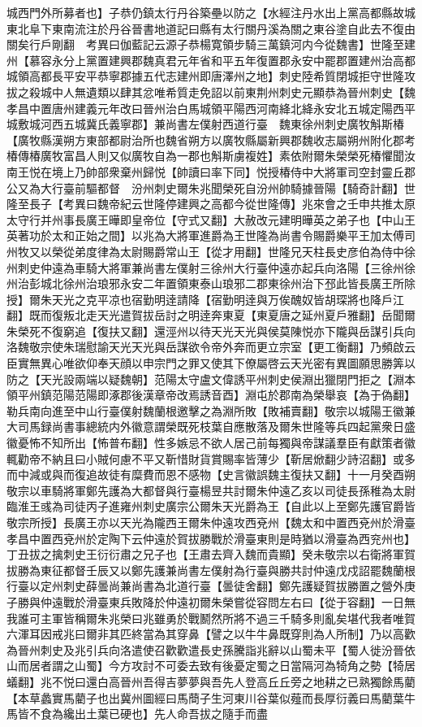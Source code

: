 城西門外所募者也】子恭仍鎮太行丹谷築壘以防之【水經注丹水出上黨高都縣故城東北阜下東南流注於丹谷晉書地道記曰縣有太行關丹溪為關之東谷塗自此去不復由關矣行戶剛翻　考異曰伽藍記云源子恭楊寛領步騎三萬鎮河内今從魏書】世隆至建州【慕容永分上黨置建興郡魏真君元年省和平五年復置郡永安中罷郡置建州治高都城領高都長平安平恭寧郡據五代志建州即唐澤州之地】刺史陸希質閉城拒守世隆攻拔之殺城中人無遺類以肆其忿唯希質走免詔以前東荆州刺史元顯恭為晉州刺史【魏孝昌中置唐州建義元年改曰晉州治白馬城領平陽西河南絳北絳永安北五城定陽西平城敷城河西五城冀氏義寧郡】兼尚書左僕射西道行臺　魏東徐州刺史廣牧斛斯椿【廣牧縣漢朔方東部都尉治所也魏省朔方以廣牧縣屬新興郡魏收志屬朔州附化郡考椿傳椿廣牧富昌人則又似廣牧自為一郡也斛斯虜複姓】素依附爾朱榮榮死椿懼聞汝南王悦在境上乃帥部衆棄州歸悦【帥讀曰率下同】悦授椿侍中大將軍司空封靈丘郡公又為大行臺前驅都督　汾州刺史爾朱兆聞榮死自汾州帥騎據晉陽【騎奇計翻】世隆至長子【考異曰魏帝紀云世隆停建興之高都今從世隆傳】兆來會之壬申共推太原太守行并州事長廣王曄即皇帝位【守式又翻】大赦改元建明曄英之弟子也【中山王英著功於太和正始之間】以兆為大將軍進爵為王世隆為尚書令賜爵樂平王加太傅司州牧又以榮從弟度律為太尉賜爵常山王【從才用翻】世隆兄天柱長史彦伯為侍中徐州刺史仲遠為車騎大將軍兼尚書左僕射三徐州大行臺仲遠亦起兵向洛陽【三徐州徐州治彭城北徐州治琅邪永安二年置領東泰山琅邪二郡東徐州治下邳此皆長廣王所除授】爾朱天光之克平凉也宿勤明逹請降【宿勤明逹與万俟醜奴皆胡琛將也降戶江翻】既而復叛北走天光遣賀拔岳討之明逹奔東夏【東夏唐之延州夏戶雅翻】岳聞爾朱榮死不復窮追【復扶又翻】還涇州以待天光天光與侯莫陳悦亦下隴與岳謀引兵向洛魏敬宗使朱瑞慰諭天光天光與岳謀欲令帝外奔而更立宗室【更工衡翻】乃頻啟云臣實無異心唯欲仰奉天顔以申宗門之罪又使其下僚屬啓云天光密有異圖願思勝筭以防之【天光設兩端以疑魏朝】范陽太守盧文偉誘平州刺史侯淵出獵閉門拒之【淵本領平州鎮范陽范陽即涿郡後漢章帝改焉誘音酉】淵屯於郡南為榮舉哀【為于偽翻】勒兵南向進至中山行臺僕射魏蘭根邀擊之為淵所敗【敗補賣翻】敬宗以城陽王徽兼大司馬録尚書事總統内外徽意謂榮既死枝葉自應散落及爾朱世隆等兵四起黨衆日盛徽憂怖不知所出【怖普布翻】性多嫉忌不欲人居己前每獨與帝謀議羣臣有獻策者徽輒勸帝不納且曰小賊何慮不平又靳惜財貨賞賜率皆薄少【靳居焮翻少詩沼翻】或多而中減或與而復追故徒有糜費而恩不感物【史言徽誤魏主復扶又翻】十一月癸酉朔敬宗以車騎將軍鄭先護為大都督與行臺楊昱共討爾朱仲遠乙亥以司徒長孫稚為太尉臨淮王彧為司徒丙子進雍州刺史廣宗公爾朱天光爵為王【自此以上至鄭先護官爵皆敬宗所授】長廣王亦以天光為隴西王爾朱仲遠攻西兗州【魏太和中置西兗州於滑臺孝昌中置西兗州於定陶下云仲遠於賀拔勝戰於滑臺東則是時猶以滑臺為西兖州也】丁丑拔之擒刺史王衍衍肅之兄子也【王肅去齊入魏而貴顯】癸未敬宗以右衛將軍賀拔勝為東征都督壬辰又以鄭先護兼尚書左僕射為行臺與勝共討仲遠戊戍詔罷魏蘭根行臺以定州刺史薛曇尚兼尚書為北道行臺【曇徒舍翻】鄭先護疑賀拔勝置之營外庚子勝與仲遠戰於滑臺東兵敗降於仲遠初爾朱榮嘗從容問左右曰【從于容翻】一日無我誰可主軍皆稱爾朱兆榮曰兆雖勇於戰鬭然所將不過三千騎多則亂矣堪代我者唯賀六渾耳因戒兆曰爾非其匹終當為其穿鼻【譬之以牛牛鼻既穿則為人所制】乃以高歡為晉州刺史及兆引兵向洛遣使召歡歡遣長史孫騰詣兆辭以山蜀未平【蜀人徙汾晉依山而居者謂之山蜀】今方攻討不可委去致有後憂定蜀之日當隔河為犄角之勢【犄居蟻翻】兆不悦曰還白高晉州吾得吉夢夢與吾先人登高丘丘旁之地耕之已熟獨餘馬藺【本草蠡實馬藺子也出冀州圖經曰馬蕳子生河東川谷葉似薤而長厚衍義曰馬藺葉牛馬皆不食為纔出土葉已硬也】先人命吾拔之隨手而盡